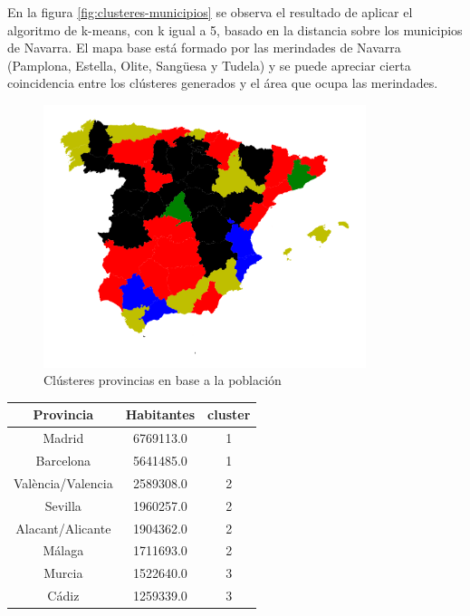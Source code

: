 En la figura \ref{fig:clusteres-municipios} se observa el resultado de aplicar el algoritmo de k-means, con k igual a 5, basado en la distancia sobre los municipios de Navarra.
El mapa base está formado por las merindades de Navarra (Pamplona, Estella, Olite, Sangüesa y Tudela)
y se puede apreciar cierta coincidencia entre los clústeres generados y el área que ocupa las merindades.

\begin{figure}[H]
    \centering
    \includegraphics[width=0.84\textwidth]{Imagenes/GeoAI/kmeans-atributo.png}
    \caption{Clústeres provincias en base a la población} \label{fig:clusteres-provincias}
\end{figure}

\begin{table}[H]
    \centering
    \begin{tabular}{|c|c|c|}
    \hline
    Provincia         & Habitantes & cluster \\
    \hline
    Madrid            & 6769113.0  &  1      \\
    \hline
    Barcelona         & 5641485.0  &  1      \\
    \hline
    València/Valencia & 2589308.0  &  2      \\
    \hline
    Sevilla           & 1960257.0  &  2      \\
    \hline
    Alacant/Alicante  & 1904362.0  &  2      \\
    \hline
    Málaga            & 1711693.0  &  2      \\
    \hline
    Murcia            & 1522640.0  &  3      \\
    \hline
    Cádiz             & 1259339.0  &  3      \\
    \hline
    \end{tabular}
\end{table}

